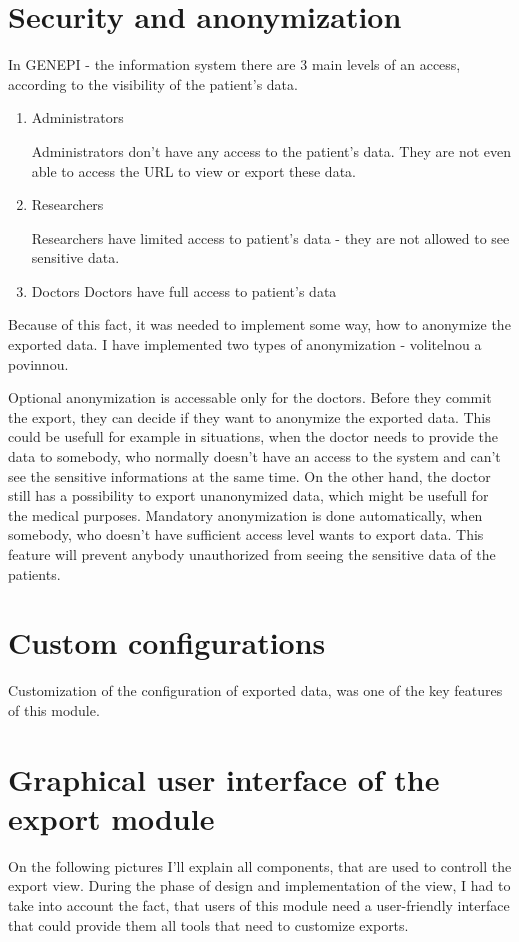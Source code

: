 \documentclass[thesis=B,english]{FITthesis}[2012/10/20]
\begin{document}
\section{Security and anonymization}
In GENEPI - the information system there are 3 main levels of an access, according to the visibility of the patient's data.
\begin{enumerate}
\item{Administrators}

Administrators don't have any access to the patient's data. They are not even able to access the URL to view or export these data.
\item{Researchers}

Researchers have limited access to patient's data - they are not allowed to see sensitive data.
\item{Doctors}
Doctors have full access to patient's data

\end{enumerate}
Because of this fact, it was needed to implement some way, how to anonymize the exported data. I have implemented two types of anonymization - volitelnou a povinnou.

Optional anonymization is accessable only for the doctors. Before they commit the export, they can decide if they want to anonymize the exported data. This could be usefull for example in situations, when the doctor needs to provide the data to somebody, who normally doesn't have an access to the system and can't see the sensitive informations at the same time. On the other hand, the doctor still has a possibility to export unanonymized data, which might be usefull for the medical purposes.
Mandatory anonymization is done automatically, when somebody, who doesn't have sufficient access level wants to export data. This feature will prevent anybody unauthorized from seeing the sensitive data of the patients.
\section{Custom configurations}
Customization of the configuration of exported data, was one of the key features of this module.
\section{Graphical user interface of the export module}
On the following pictures I'll explain all components, that are used to controll the export view. During the phase of design and implementation of the view, I had to take into account the fact, that users of this module need a user-friendly interface that could provide them all tools that need to customize exports.
\end{document}
